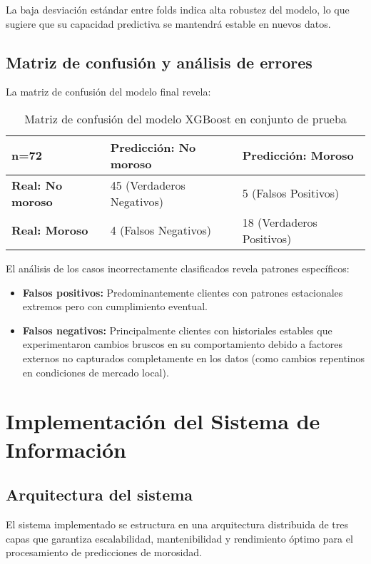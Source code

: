 La baja desviación estándar entre folds indica alta robustez del modelo, lo que sugiere que su capacidad predictiva se mantendrá estable en nuevos datos.

\subsection{Matriz de confusión y análisis de errores}
La matriz de confusión del modelo final revela:

\begin{table}[ht]
\centering
\begin{tabular}{|p{3cm}|p{3cm}|p{3cm}|}
\hline
\textbf{n=72} & \textbf{Predicción: No moroso} & \textbf{Predicción: Moroso} \\
\hline
\textbf{Real: No moroso} & 45 (Verdaderos Negativos) & 5 (Falsos Positivos) \\
\hline
\textbf{Real: Moroso} & 4 (Falsos Negativos) & 18 (Verdaderos Positivos) \\
\hline
\end{tabular}
\caption{Matriz de confusión del modelo XGBoost en conjunto de prueba}
\end{table}

El análisis de los casos incorrectamente clasificados revela patrones específicos:

\begin{itemize}
    \item \textbf{Falsos positivos:} Predominantemente clientes con patrones estacionales extremos pero con cumplimiento eventual.
    
    \item \textbf{Falsos negativos:} Principalmente clientes con historiales estables que experimentaron cambios bruscos en su comportamiento debido a factores externos no capturados completamente en los datos (como cambios repentinos en condiciones de mercado local).
\end{itemize}

\section{Implementación del Sistema de Información}
\subsection{Arquitectura del sistema}

El sistema implementado se estructura en una arquitectura distribuida de tres capas que garantiza escalabilidad, mantenibilidad y rendimiento óptimo para el procesamiento de predicciones de morosidad.

